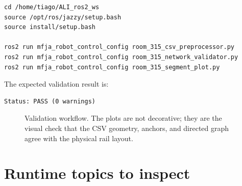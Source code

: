\documentclass[12pt,a4paper]{report}
\newcommand{\codenext}[1]{\par\Needspace{#1\baselineskip}}
\begin{document}
\codenext{10}
\begin{lstlisting}[style=terminalcode,caption={Room 315 preprocessing and validation commands.}]
cd /home/tiago/ALI_ros2_ws
source /opt/ros/jazzy/setup.bash
source install/setup.bash

ros2 run mfja_robot_control_config room_315_csv_preprocessor.py
ros2 run mfja_robot_control_config room_315_network_validator.py
ros2 run mfja_robot_control_config room_315_segment_plot.py
\end{lstlisting}

The expected validation result is:

\begin{lstlisting}[style=terminalcode]
Status: PASS (0 warnings)
\end{lstlisting}

\begin{figure}[p]
\centering
{}
\caption{Validation workflow. The plots are not decorative; they are the visual
check that the CSV geometry, anchors, and directed graph agree with the physical
rail layout.}
\label{fig:validation-flow}
\end{figure}

\section{Runtime topics to inspect}
\end{document}
